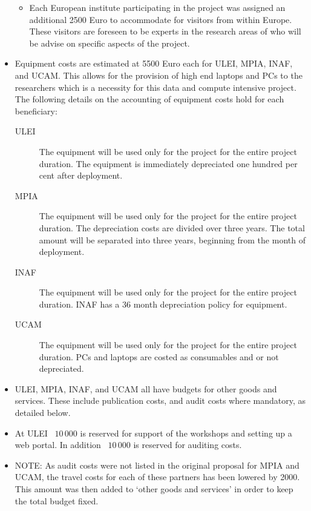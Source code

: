 \begin{itemize}
\begin{itemize}
        \item Each European institute participating in the project was assigned an additional 2500 Euro to accommodate for visitors from within Europe. These visitors are foreseen to be experts in the research areas of {\acro} who will be advise on specific aspects of the project.
    \end{itemize}
    \item Equipment costs are estimated at 5500 Euro each for ULEI, MPIA, INAF, and UCAM. This allows for the provision of high end laptops and PCs to the researchers which is a necessity for this data and compute intensive project. The following details on the accounting of equipment costs hold for each beneficiary:
    \begin{description}
        \item[ULEI] The equipment will be used only for the project for the entire project duration. The equipment is immediately depreciated one hundred per cent after deployment.
        \item[MPIA] The equipment will be used only for the project for the entire project duration. The depreciation costs are divided over three years. The total amount will be separated into three years, beginning from the month of deployment.
        \item[INAF] The equipment will be used only for the project for the entire project duration. INAF has a 36 month depreciation policy for equipment.
        \item[UCAM] The equipment will be used only for the project for the entire project duration. PCs and laptops are costed as consumables and or not depreciated.
    \end{description}
    \item ULEI, MPIA, INAF, and UCAM all have budgets for other goods and services. These include publication costs, and audit costs where mandatory, as detailed below.
    \item At ULEI \EUR\ $10\,000$ is reserved for support of the workshops and setting up a web portal. In addition \EUR\ $10\,000$ is reserved for auditing costs.
    \item NOTE: As audit costs were not listed in the original proposal for MPIA and UCAM, the travel costs for each of these partners has been lowered by 2000\EUR. This amount was then added to `other goods and services' in order to keep the total budget fixed.
\end{itemize}

